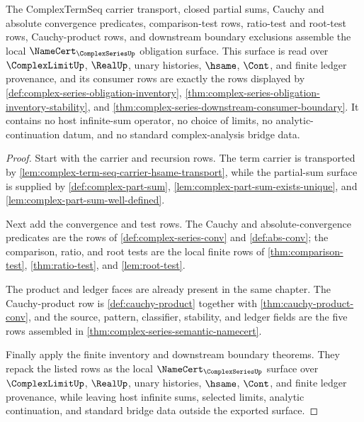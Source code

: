 \begin{theorem}
\label{thm:complexseries-namecert-obligation-surface}
The ComplexTermSeq carrier transport, closed partial sums, Cauchy and absolute
convergence predicates, comparison-test rows, ratio-test and root-test rows,
Cauchy-product rows, and downstream boundary exclusions assemble the local
$\NameCert_{\ComplexSeriesUp}$ obligation surface. This surface is read over
$\ComplexLimitUp$, $\RealUp$, unary histories, $\hsame$, $\Cont$, and finite
ledger provenance, and its consumer rows are exactly the rows displayed by
\autoref{def:complex-series-obligation-inventory},
\autoref{thm:complex-series-obligation-inventory-stability}, and
\autoref{thm:complex-series-downstream-consumer-boundary}. It contains no host
infinite-sum operator, no choice of limits, no analytic-continuation datum, and
no standard complex-analysis bridge data.
\end{theorem}
\begin{proof}
Start with the carrier and recursion rows. The term carrier is transported by
\autoref{lem:complex-term-seq-carrier-hsame-transport}, while the partial-sum
surface is supplied by \autoref{def:complex-part-sum},
\autoref{lem:complex-part-sum-exists-unique}, and
\autoref{lem:complex-part-sum-well-defined}.

Next add the convergence and test rows. The Cauchy and absolute-convergence
predicates are the rows of \autoref{def:complex-series-conv} and
\autoref{def:abs-conv}; the comparison, ratio, and root tests are the local
finite rows of \autoref{thm:comparison-test}, \autoref{thm:ratio-test}, and
\autoref{lem:root-test}.

The product and ledger faces are already present in the same chapter. The
Cauchy-product row is \autoref{def:cauchy-product} together with
\autoref{thm:cauchy-product-conv}, and the source, pattern, classifier,
stability, and ledger fields are the five rows assembled in
\autoref{thm:complex-series-semantic-namecert}.

Finally apply the finite inventory and downstream boundary theorems. They
repack the listed rows as the local $\NameCert_{\ComplexSeriesUp}$ surface over
$\ComplexLimitUp$, $\RealUp$, unary histories, $\hsame$, $\Cont$, and finite
ledger provenance, while leaving host infinite sums, selected limits, analytic
continuation, and standard bridge data outside the exported surface.
\end{proof}


